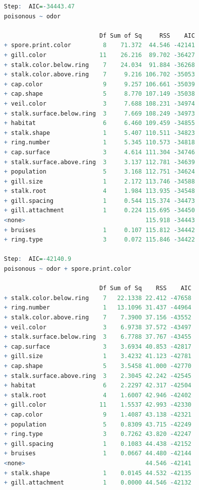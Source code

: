 \documentclass[12pt]{article}
\begin{document}
\begin{lstlisting}[language = R]
Step:  AIC=-34443.47
poisonous ~ odor

                           Df Sum of Sq     RSS    AIC
+ spore.print.color         8    71.372  44.546 -42141
+ gill.color               11    26.216  89.702 -36427
+ stalk.color.below.ring    7    24.034  91.884 -36268
+ stalk.color.above.ring    7     9.216 106.702 -35053
+ cap.color                 9     9.257 106.661 -35039
+ cap.shape                 5     8.770 107.149 -35038
+ veil.color                3     7.688 108.231 -34974
+ stalk.surface.below.ring  3     7.669 108.249 -34973
+ habitat                   6     6.460 109.459 -34855
+ stalk.shape               1     5.407 110.511 -34823
+ ring.number               1     5.345 110.573 -34818
+ cap.surface               3     4.614 111.304 -34746
+ stalk.surface.above.ring  3     3.137 112.781 -34639
+ population                5     3.168 112.751 -34624
+ gill.size                 1     2.172 113.746 -34588
+ stalk.root                4     1.984 113.935 -34548
+ gill.spacing              1     0.544 115.374 -34473
+ gill.attachment           1     0.224 115.695 -34450
<none>                                  115.918 -34443
+ bruises                   1     0.107 115.812 -34442
+ ring.type                 3     0.072 115.846 -34422

Step:  AIC=-42140.9
poisonous ~ odor + spore.print.color

                           Df Sum of Sq    RSS    AIC
+ stalk.color.below.ring    7   22.1338 22.412 -47658
+ ring.number               1   13.1096 31.437 -44964
+ stalk.color.above.ring    7    7.3900 37.156 -43552
+ veil.color                3    6.9738 37.572 -43497
+ stalk.surface.below.ring  3    6.7788 37.767 -43455
+ cap.surface               3    3.6934 40.853 -42817
+ gill.size                 1    3.4232 41.123 -42781
+ cap.shape                 5    3.5458 41.000 -42770
+ stalk.surface.above.ring  3    2.3045 42.242 -42545
+ habitat                   6    2.2297 42.317 -42504
+ stalk.root                4    1.6007 42.946 -42402
+ gill.color               11    1.5537 42.993 -42330
+ cap.color                 9    1.4087 43.138 -42321
+ population                5    0.8309 43.715 -42249
+ ring.type                 3    0.7262 43.820 -42247
+ gill.spacing              1    0.1083 44.438 -42152
+ bruises                   1    0.0667 44.480 -42144
<none>                                  44.546 -42141
+ stalk.shape               1    0.0145 44.532 -42135
+ gill.attachment           1    0.0000 44.546 -42132


\end{lstlisting}
\end{document}
